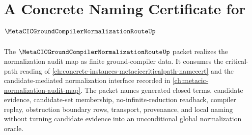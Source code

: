 \chapter{A Concrete Naming Certificate for $\MetaCICGroundCompilerNormalizationRouteUp$}
\label{ch:concrete-instances-metacic-ground-compiler-normalization-route-namecert}

The $\MetaCICGroundCompilerNormalizationRouteUp$ packet realizes the normalization audit map as finite ground-compiler data. It consumes the critical-path reading of \autoref{ch:concrete-instances-metaciccriticalpath-namecert} and the candidate-mediated normalization interface recorded in \autoref{ch:metacic-normalization-audit-map}. The packet names generated closed terms, candidate evidence, candidate-set membership, no-infinite-reduction readback, compiler replay, obstruction boundary rows, transport, provenance, and local naming without turning candidate evidence into an unconditional global normalization oracle.

